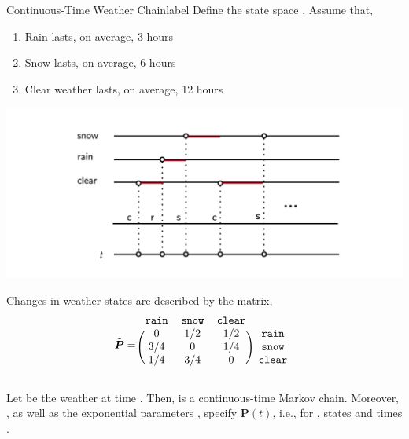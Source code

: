 \documentclass{tufte-handout}
\begin{document}
\begin{ex}{Continuous-Time Weather Chain}{label}
  Define the state space . Assume that,
  \begin{enumerate}
    \item Rain lasts, on average, 3 hours
    \item Snow lasts, on average, 6 hours
    \item Clear weather lasts, on average, 12 hours
  \end{enumerate}

  \begin{center}
    \includegraphics[width=\textwidth]{fig-23.png}
  \end{center}

  Changes in weather states are described by the matrix,
   \[\tilde{\boldsymbol{P}} = \begin{blockarray}{cccc}
    \texttt{rain} & \texttt{snow} & \texttt{clear} \\
    \begin{block}{(ccc)c}
      0 & 1/2 & 1/2 & \texttt{rain} \\
      3/4 & 0 & 1/4 & \texttt{snow} \\
      1/4 & 3/4 & 0 & \texttt{clear} \\
    \end{block}
    \end{blockarray}\]

  Let  be the weather at time . Then,  is a continuous-time Markov chain. Moreover, , as well as the exponential parameters , specify $\mathbf{P}(t)$, i.e.,  for , states  and times .
\end{ex}
\end{document}
